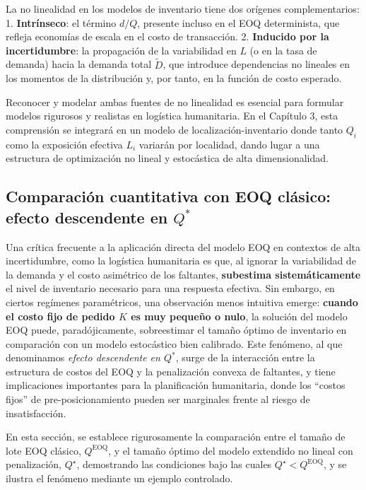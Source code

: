 \documentclass[
  spanish,
  us-letterpaper,
]{scrreprt}
\numberwithin{equation}{section}
\begin{document}
La no linealidad en los modelos de inventario tiene dos orígenes
complementarios: 1. \textbf{Intrínseco}: el término \(d/Q\), presente
incluso en el EOQ determinista, que refleja economías de escala en el
costo de transacción. 2. \textbf{Inducido por la incertidumbre}: la
propagación de la variabilidad en \(L\) (o en la tasa de demanda) hacia
la demanda total \(\tilde{D}\), que introduce dependencias no lineales
en los momentos de la distribución y, por tanto, en la función de costo
esperado.

Reconocer y modelar ambas fuentes de no linealidad es esencial para
formular modelos rigurosos y realistas en logística humanitaria. En el
Capítulo 3, esta comprensión se integrará en un modelo de
localización-inventario donde tanto \(Q_i\) como la exposición efectiva
\(L_i\) variarán por localidad, dando lugar a una estructura de
optimización no lineal y estocástica de alta dimensionalidad.

\subsection{\texorpdfstring{Comparación cuantitativa con EOQ clásico:
efecto descendente en
\(Q^*\)}{Comparación cuantitativa con EOQ clásico: efecto descendente en Q\^{}*}}\label{sec-cuantitativa}

Una crítica frecuente a la aplicación directa del modelo EOQ en
contextos de alta incertidumbre, como la logística humanitaria es que,
al ignorar la variabilidad de la demanda y el costo asimétrico de los
faltantes, \textbf{subestima sistemáticamente} el nivel de inventario
necesario para una respuesta efectiva. Sin embargo, en ciertos regímenes
paramétricos, una observación menos intuitiva emerge: \textbf{cuando el
costo fijo de pedido \(K\) es muy pequeño o nulo}, la solución del
modelo EOQ puede, paradójicamente, sobreestimar el tamaño óptimo de
inventario en comparación con un modelo estocástico bien calibrado. Este
fenómeno, al que denominamos \emph{efecto descendente en \(Q^*\)}, surge
de la interacción entre la estructura de costos del EOQ y la
penalización convexa de faltantes, y tiene implicaciones importantes
para la planificación humanitaria, donde los ``costos fijos'' de
pre-posicionamiento pueden ser marginales frente al riesgo de
insatisfacción.

En esta sección, se establece rigurosamente la comparación entre el
tamaño de lote EOQ clásico, \(Q^{\text{EOQ}}\), y el tamaño óptimo del
modelo extendido no lineal con penalización, \(Q^\star\), demostrando
las condiciones bajo las cuales \(Q^\star < Q^{\text{EOQ}}\), y se
ilustra el fenómeno mediante un ejemplo controlado.
\end{document}
